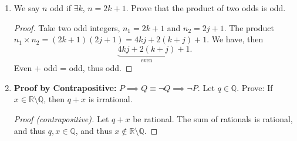 \documentclass[12pt]{article}
\begin{document}
\begin{enumerate}
  \item We say $n$ odd if $\exists k$, $n = 2k+1$. Prove that the product of two odds is odd.
  \begin{proof}[Proof]
    Take two odd integers, $n_1 = 2k+1$ and $n_2 = 2j+1$. The product $n_1 \times n_2 = (2k+1)(2j+1) = 4kj+2(k+j)+1$. We have, then \[\underbrace{4kj+2(k+j)}_{\text{even}} + 1.\] Even + odd = odd, thus odd.
  \end{proof}

  \item \textbf{Proof by Contrapositive:} $P \implies Q \equiv \neg Q \implies \neg P$. 
  Let $q \in \mathbb{Q}$. Prove: If $x \in \mathbb{R}\setminus\mathbb{Q}$, then $q+x$ is irrational.
  \begin{proof}[Proof (contrapositive)]
    Let $q+x$ be rational. The sum of rationals is rational, and thus $q,x \in \mathbb{Q}$, and thus $x \notin \mathbb{R} \setminus \mathbb{Q}$.
  \end{proof}


\end{enumerate}
\end{document}
